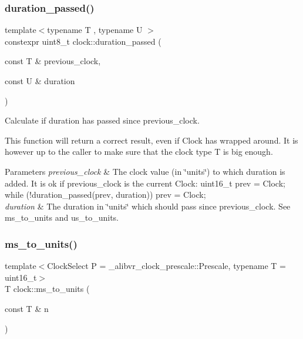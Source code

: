 \subsubsection{\texorpdfstring{duration\+\_\+passed()}{duration\_passed()}\hspace{0.1cm}{\footnotesize\ttfamily [2/2]}}
{\footnotesize\ttfamily template$<$typename T , typename U $>$ \\
constexpr uint8\+\_\+t clock\+::duration\+\_\+passed (\begin{DoxyParamCaption}\item[{const T \&}]{previous\+\_\+clock,  }\item[{const U \&}]{duration }\end{DoxyParamCaption})\hspace{0.3cm}{\ttfamily [inline]}}



Calculate if duration has passed since previous\+\_\+clock. 

This function will return a correct result, even if Clock has wrapped around. It is however up to the caller to make sure that the clock type T is big enough.


\begin{DoxyParams}{Parameters}
{\em previous\+\_\+clock} & The clock value (in \char`\"{}units\char`\"{}) to which duration is added. It is ok if previous\+\_\+clock is the current Clock\+: {\ttfamily uint16\+\_\+t prev = Clock; while (!duration\+\_\+passed(prev, duration)) prev = Clock;} \\
\hline
{\em duration} & The duration in \char`\"{}units\char`\"{} which should pass since previous\+\_\+clock. See ms\+\_\+to\+\_\+units and us\+\_\+to\+\_\+units. \\
\hline
\end{DoxyParams}
\hypertarget{namespaceclock_a2e5ca91b796d0c96b8094ba1441daedc}{}\label{namespaceclock_a2e5ca91b796d0c96b8094ba1441daedc} 
\subsubsection{\texorpdfstring{ms\+\_\+to\+\_\+units()}{ms\_to\_units()}\hspace{0.1cm}{\footnotesize\ttfamily [1/2]}}
{\footnotesize\ttfamily template$<$Clock\+Select P = \+\_\+alibvr\+\_\+clock\+\_\+prescale\+::\+Prescale, typename T  = uint16\+\_\+t$>$ \\
T clock\+::ms\+\_\+to\+\_\+units (\begin{DoxyParamCaption}\item[{const T \&}]{n }\end{DoxyParamCaption})\hspace{0.3cm}{\ttfamily [inline]}}



